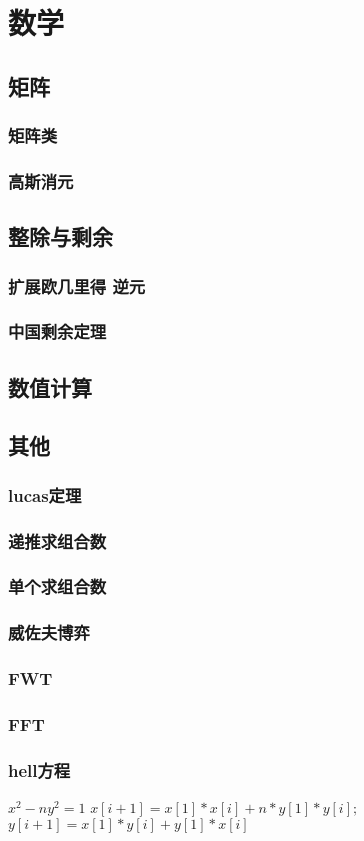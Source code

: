 \documentclass[main.tex]{subfiles}
\begin{document}
\chapter{数学}
\section{矩阵}
    \subsection{矩阵类}
        
    \subsection{高斯消元}
        
\section{整除与剩余}
    \subsection{扩展欧几里得 逆元}
        
    \subsection{中国剩余定理}
        
\section{数值计算}
\section{其他}
    \subsection{lucas定理}
        
    \subsection{递推求组合数}
        
    \subsection{单个求组合数}
        
    \subsection{威佐夫博弈}
        
    \subsection{FWT}
        
    \subsection{FFT}
        
    \subsection{hell方程}
        $ x^2-ny^2 = 1$
        $ x[i+1] = x[1]*x[i] + n*y[1]*y[i]; $
        $ y[i+1] = x[1]*y[i] + y[1]*x[i] $
\end{document}

